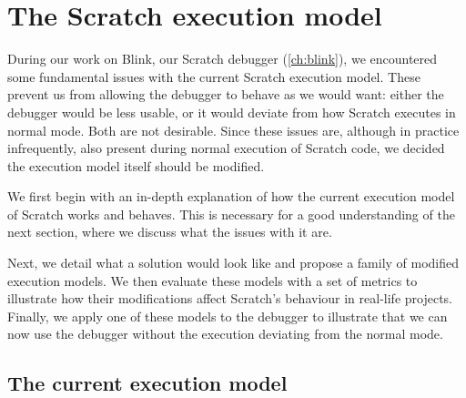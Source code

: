 \documentclass[../main]{subfiles}
\begin{document}
\chapter{The Scratch execution model}\label{ch:scratch-execution-model}


During our work on Blink, our Scratch debugger (\cref{ch:blink}), we encountered some fundamental issues with the current Scratch execution model.
These prevent us from allowing the debugger to behave as we would want: either the debugger would be less usable, or it would deviate from how Scratch executes in normal mode.
Both are not desirable.
Since these issues are, although in practice infrequently, also present during normal execution of Scratch code, we decided the execution model itself should be modified.

We first begin with an in-depth explanation of how the current execution model of Scratch works and behaves.
This is necessary for a good understanding of the next section, where we discuss what the issues with it are.

Next, we detail what a solution would look like and propose a family of modified execution models.
We then evaluate these models with a set of metrics to illustrate how their modifications affect Scratch's behaviour in real-life projects.
Finally, we apply one of these models to the debugger to illustrate that we can now use the debugger without the execution deviating from the normal mode.

\section{The current execution model}\label{sec:the-current-scratch-execution-model}
\end{document}
